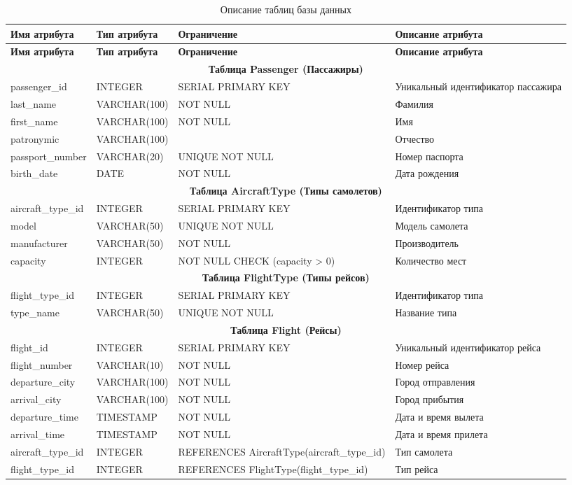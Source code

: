 \documentclass[a4paper,12pt]{article}
\begin{document}
\begin{longtable}{|p{3cm}|p{3cm}|p{2.5cm}|p{6cm}|}
\caption{Описание таблиц базы данных} \label{tab:tables} \\
\hline
\textbf{Имя атрибута} & \textbf{Тип атрибута} & \textbf{Ограничение} & \textbf{Описание атрибута} \\
\hline
\endfirsthead

\hline
\textbf{Имя атрибута} & \textbf{Тип атрибута} & \textbf{Ограничение} & \textbf{Описание атрибута} \\
\hline
\endhead

\multicolumn{4}{|c|}{\textbf{Таблица Passenger (Пассажиры)}} \\
\hline
passenger\_id & INTEGER & SERIAL PRIMARY KEY & Уникальный идентификатор пассажира \\
last\_name & VARCHAR(100) & NOT NULL & Фамилия \\
first\_name & VARCHAR(100) & NOT NULL & Имя \\
patronymic & VARCHAR(100) &  & Отчество \\
passport\_number & VARCHAR(20) & UNIQUE NOT NULL & Номер паспорта \\
birth\_date & DATE & NOT NULL & Дата рождения \\
\hline

\multicolumn{4}{|c|}{\textbf{Таблица AircraftType (Типы самолетов)}} \\
\hline
aircraft\_type\_id & INTEGER & SERIAL PRIMARY KEY & Идентификатор типа \\
model & VARCHAR(50) & UNIQUE NOT NULL & Модель самолета \\
manufacturer & VARCHAR(50) & NOT NULL & Производитель \\
capacity & INTEGER & NOT NULL CHECK (capacity > 0) & Количество мест \\
\hline

\multicolumn{4}{|c|}{\textbf{Таблица FlightType (Типы рейсов)}} \\
\hline
flight\_type\_id & INTEGER & SERIAL PRIMARY KEY & Идентификатор типа \\
type\_name & VARCHAR(50) & UNIQUE NOT NULL & Название типа \\
\hline

\multicolumn{4}{|c|}{\textbf{Таблица Flight (Рейсы)}} \\
\hline
flight\_id & INTEGER & SERIAL PRIMARY KEY & Уникальный идентификатор рейса \\
flight\_number & VARCHAR(10) & NOT NULL & Номер рейса \\
departure\_city & VARCHAR(100) & NOT NULL & Город отправления \\
arrival\_city & VARCHAR(100) & NOT NULL & Город прибытия \\
departure\_time & TIMESTAMP & NOT NULL & Дата и время вылета \\
arrival\_time & TIMESTAMP & NOT NULL & Дата и время прилета \\
aircraft\_type\_id & INTEGER & REFERENCES AircraftType(aircraft\_type\_id) & Тип самолета \\
flight\_type\_id & INTEGER & REFERENCES FlightType(flight\_type\_id) & Тип рейса \\
\hline


\end{longtable}
\end{document}
